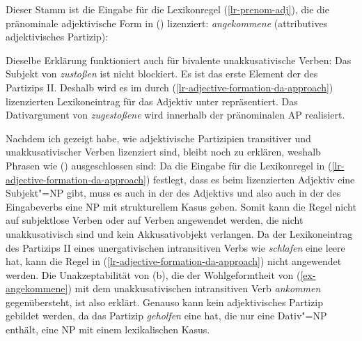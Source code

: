 {\noindent
Dieser Stamm ist die Eingabe für die Lexikonregel (\ref{lr-prenom-adj}),
die die pränominale adjektivische Form in () lizenziert:
\eas
\emph{angekommene} (attributives adjektivisches Partizip):\\
\zs

\noindent
Dieselbe Erklärung funktioniert auch für bivalente unakkusativische Verben:
\z
Das Subjekt von \emph{zustoßen} ist nicht blockiert.
Es ist das erste Element der \argstl des Partizips II.
Deshalb wird es im durch (\ref{lr-adjective-formation-da-approach}) lizenzierten
Lexikoneintrag für das Adjektiv unter \subj repräsentiert.
Das Dativargument von \emph{zugestoßene} wird innerhalb der pränominalen AP realisiert.

Nachdem ich gezeigt habe, wie adjektivische Partizipien transitiver
und unakkusativischer Verben lizenziert sind, bleibt noch zu erklären,
weshalb Phrasen wie () ausgeschlossen sind:
Da die Eingabe für die Lexikonregel in (\ref{lr-adjective-formation-da-approach})
festlegt, dass es beim lizenzierten Adjektiv eine Subjekt"=NP gibt, muss es auch in der \argstl des
Adjektivs und also auch in der \argstl des Eingabeverbs eine NP mit strukturellem Kasus
geben. Somit kann die Regel nicht auf subjektlose Verben oder auf Verben angewendet
werden, die nicht unakkusativisch sind und kein Akkusativobjekt verlangen.
\eal
{}
\zl
Da der Lexikoneintrag des Partizips II eines unergativischen intransitiven Verbs
wie \emph{schlafen} eine leere \argstl hat, kann die Regel in (\ref{lr-adjective-formation-da-approach}) nicht angewendet
werden. Die Unakzeptabilität von (b), die der Wohlgeformtheit von (\ref{ex-angekommene}) mit dem unakkusativischen
intransitiven Verb \emph{ankommen} gegenübersteht, ist also erklärt.
Genauso kann kein adjektivisches Partizip  gebildet werden, da das Partizip \emph{geholfen}
eine \argstl hat, die nur eine Dativ"=NP enthält, \dash eine NP mit einem lexikalischen Kasus.


}
